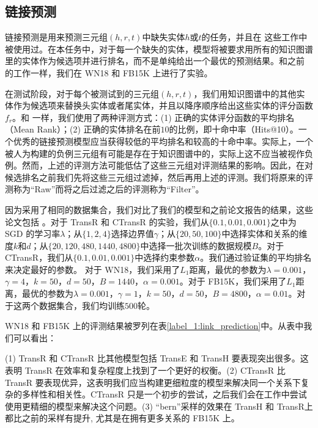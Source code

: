     \subsection{链接预测}
    链接预测是用来预测三元组$(h, r, t)$中缺失实体$h$或$t$的任务，并且在  这些工作中被使用过。在本任务中，对于每一个缺失的实体，模型将被要求用所有的知识图谱里的实体作为候选项并进行排名，而不是单纯给出一个最优的预测结果。和之前  的工作一样，我们在 WN18 和 FB15K 上进行了实验。

    在测试阶段，对于每个被测试到的三元组$(h, r, t)$，我们用知识图谱中的其他实体作为候选项来替换头实体或者尾实体，并且以降序顺序给出这些实体的评分函数$f_r$。和  一样，我们使用了两种评测方式：(1) 正确的实体评分函数的平均排名（Mean Rank）；(2) 正确的实体排名在前$10$的比例，即十命中率（Hits@10）。一个优秀的链接预测模型应当获得较低的平均排名和较高的十命中率。实际上，一个被人为构建的负例三元组有可能是存在于知识图谱中的，实际上这不应当被视作负例。然而，上述的评测方法可能低估了这些三元组对评测结果的影响。因此，在对候选排名之前我们先将这些三元组过滤掉，然后再用上述的评测。我们将原来的评测称为``Raw''而将之后过滤之后的评测称为``Filter''。

    因为采用了相同的数据集合，我们对比了我们的模型和之前论文报告的结果，这些论文包括 。对于 TransR 和 CTransR 的实验，我们从$\{0.1, 0.01, 0.001\}$之中为 SGD 的学习率$\lambda$；从$\{1, 2, 4\}$选择边界值$\gamma$；从$\{20,50,100\}$中选择实体和关系的维度$k$和$d$；从$\{20, 120, 480, 1440, 4800\}$中选择一批次训练的数据规模$B$。对于 CTransR，我们从$\{0.1,0.01,0.001\}$中选择约束参数$\alpha$。我们通过验证集的平均排名来决定最好的参数。
    对于 WN18，我们采用了$L_1$距离，最优的参数为$\lambda = 0.001$，$\gamma= 4$，$k = 50$，$d = 50$，$B = 1440$，$\alpha=0.001$。对于 FB15K，我们采用了$L_1$距离，最优的参数为$\lambda = 0.001$，$\gamma = 1$，$k = 50$，$d = 50$，$B = 4800$，$\alpha=0.01$。对于这两个数据集合，我们均训练$500$轮。

    WN18 和 FB15K 上的评测结果被罗列在表\ref{label_1:link_prediction}中。从表中我们可以看出：


     (1) TransR 和 CTransR 比其他模型包括 TransE 和 TransH 要表现突出很多。这表明 TransR 在效率和复杂程度上找到了一个更好的权衡。(2) CTransR 比 TransR 要表现优异，这表明我们应当构建更细粒度的模型来解决同一个关系下复杂的多样性和相关性。CTransR 只是一个初步的尝试，之后我们会在工作中尝试使用更精细的模型来解决这个问题。(3) ``bern''采样的效果在 TransH 和 TransR上都比之前的采样有提升, 尤其是在拥有更多关系的 FB15K 上。

